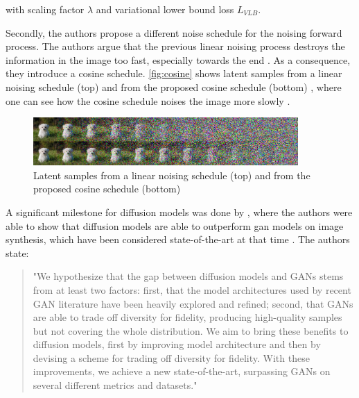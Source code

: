 with scaling factor $\lambda$ and variational lower bound loss $L_{VLB}$.

Secondly, the authors propose a different noise schedule for the noising forward process.
The authors argue that the previous linear noising process destroys the information in the image too fast, especially towards the end \cite{nichol2021ImprovedDenoisingDiffusion}.
As a consequence, they introduce a cosine schedule.
\autoref{fig:cosine} shows latent samples from a linear noising schedule (top) and from the proposed cosine schedule (bottom) \cite[Figure 3, p. 4]{nichol2021ImprovedDenoisingDiffusion}, where one can see how the cosine schedule noises the image more slowly \cite{nichol2021ImprovedDenoisingDiffusion}.

\begin{figure}[h]
    \centering
    \includegraphics[width=0.9\textwidth]{images/cosine.png}
    \caption[Noising Schedule]{Latent samples from a linear noising schedule (top) and from the proposed cosine schedule (bottom) \cite[Figure 3, p. 4]{nichol2021ImprovedDenoisingDiffusion}}
    \label{fig:cosine}
\end{figure}

A significant milestone for diffusion models was done by \cite{dhariwal2021DiffusionModelsBeat}, where the authors were able to show that diffusion models are able to outperform \gls{gan}
models on image synthesis, which have been considered state-of-the-art at that time \cite{dhariwal2021DiffusionModelsBeat}.
The authors state:

\begin{quotation}
    "We hypothesize that the gap between diffusion models and GANs stems from at least two factors: 
    first, that the model architectures used by recent GAN literature have been heavily explored and refined; 
    second, that GANs are able to trade off diversity for fidelity, producing high-quality samples but not covering the whole distribution. 
    We aim to bring these benefits to diffusion models, first by improving model architecture and then by devising a scheme for trading off diversity for fidelity. 
    With these improvements, we achieve a new state-of-the-art, surpassing GANs on several different metrics and datasets." \cite[p. 2]{dhariwal2021DiffusionModelsBeat}
\end{quotation}



